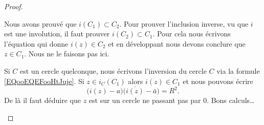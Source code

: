 \begin{proof}
\begin{enumerate}
\begin{subproof}
			      Nous avons prouvé que \( i(C_1)\subset C_2\). Pour prouver l'inclusion inverse, vu que \( i\) est une involution, il faut prouver \( i(C_2)\subset C_1\). Pour cela nous écrivons l'équation qui donne \(i(z)\in C_2 \) et en développant nous devons conclure que \( z\in C_1\). Nous ne le faisons pas ici.


			      Si \( C\) est un cercle quelconque, nous écrivons l'inversion du cercle \( C\) via la formule \eqref{EQooEQEFooHtJuje}. Si \( z\in i_C(C_1)\) alors \( i(z)\in C_1\) et nous pouvons écrire
			      \begin{equation}
				      \big( i(z)-a \big)\big( \overline{ i(z) }-\bar a \big)=R^2.
			      \end{equation}
			      De là il faut déduire que \( z\) est sur un cercle ne passant pas par \( 0\). Bons calculs\ldots
		      \end{subproof}
	\end{enumerate}
\end{proof}
